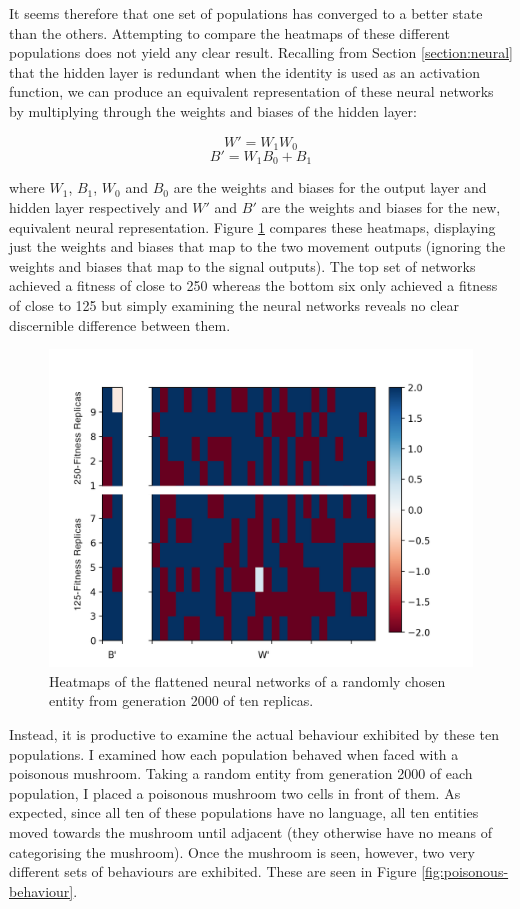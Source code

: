 \documentclass[12pt,a4paper,twoside,openright]{report}
\begin{document}
It seems therefore that one set of populations has converged to a better state than the others. Attempting to compare the heatmaps of these different populations does not yield any clear result. Recalling from Section \ref{section:neural} that the hidden layer is redundant when the identity is used as an activation function, we can produce an equivalent representation of these neural networks by multiplying through the weights and biases of the hidden layer:

$$ W' = W_1 W_0 $$
$$ B' = W_1 B_0 + B_1 $$

where $W_1$, $B_1$, $W_0$ and $B_0$ are the weights and biases for the output layer and hidden layer respectively and $W'$ and $B'$ are the weights and biases for the new, equivalent neural representation. Figure \ref{fig:compare} compares these heatmaps, displaying just the weights and biases that map to the two movement outputs (ignoring the weights and biases that map to the signal outputs). The top set of networks achieved a fitness of close to 250 whereas the bottom six only achieved a fitness of close to 125 but simply examining the neural networks reveals no clear discernible difference between them.

\begin{figure}[t]
  \centering
  \includegraphics[width=1.\linewidth]{results/compare2}
  \caption{Heatmaps of the flattened neural networks of a randomly chosen entity from generation 2000 of ten replicas.}
  \label{fig:compare}
\end{figure}

Instead, it is productive to examine the actual behaviour exhibited by these ten populations. I examined how each population behaved when faced with a poisonous mushroom. Taking a random entity from generation 2000 of each population, I placed a poisonous mushroom two cells in front of them. As expected, since all ten of these populations have no language, all ten entities moved towards the mushroom until adjacent (they otherwise have no means of categorising the mushroom). Once the mushroom is seen, however, two very different sets of behaviours are exhibited. These are seen in Figure \ref{fig:poisonous-behaviour}.
\end{document}
